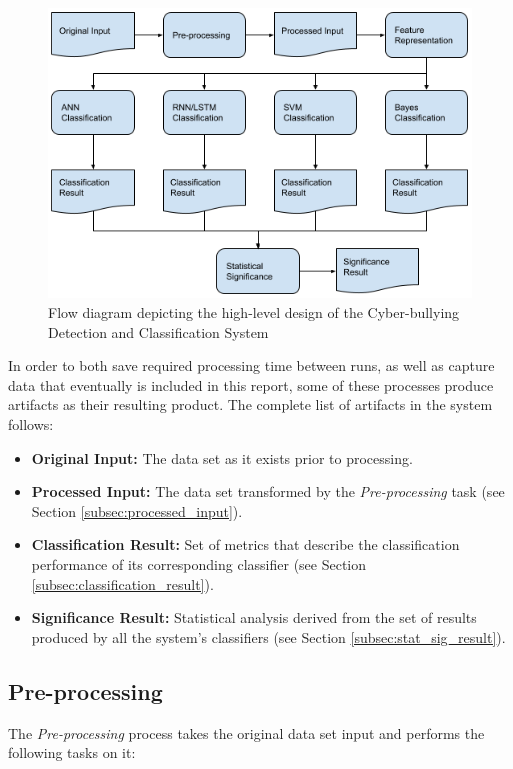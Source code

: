 \documentclass[conference]{sig-alternate-05-2015}
\begin{document}
\begin{figure}[h]
  \centering
  \includegraphics[width=\linewidth]{design.png}
  \caption{Flow diagram depicting the high-level design of the Cyber-bullying
  Detection and Classification System}
  \label{fig:design}
\end{figure}

In order to both save required processing time between runs, as well as capture
data that eventually is included in this report, some of these processes produce
artifacts as their resulting product. The complete list of artifacts in the
system follows:

\begin{itemize}
  \item \textbf{Original Input:} The data set as it exists prior to processing.
  \item \textbf{Processed Input:} The data set transformed by the
  \textit{Pre-processing} task (see Section \ref{subsec:processed_input}).
  \item \textbf{Classification Result:} Set of metrics that describe the
  classification performance of its corresponding classifier (see Section
  \ref{subsec:classification_result}).
  \item \textbf{Significance Result:} Statistical analysis derived from the set
  of results produced by all the system's classifiers (see Section
  \ref{subsec:stat_sig_result}).
\end{itemize}

\subsection{Pre-processing}\label{subsec:preprocessing}
The \textit{Pre-processing} process takes the original data set input and
performs the following tasks on it:
\end{document}
